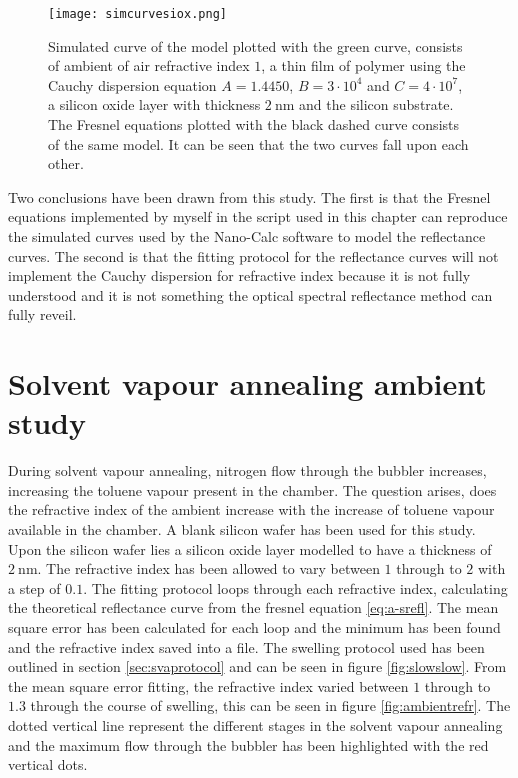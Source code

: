 \documentclass[MasterThesisMain.tex]{subfiles}
\begin{document}
\begin{figure}[H]
\centering
\texttt{[image: simcurvesiox.png]}
\caption{Simulated curve of the model plotted with the green curve, consists of ambient of air refractive index $1$, a thin film of polymer using the Cauchy dispersion equation $A=1.4450$, $B=3 \cdot 10^4$ and $C=4 \cdot 10^7$, a silicon oxide layer with thickness $\SI{2}{\nano\meter}$ and the silicon substrate. The Fresnel equations plotted with the black dashed curve consists of the same model. It can be seen that the two curves fall upon each other.}
\label{fig:simmodel2}
\end{figure}

Two conclusions have been drawn from this study. The first is that the Fresnel equations implemented by myself in the script used in this chapter can reproduce the simulated curves used by the Nano-Calc software to model the reflectance curves. The second is that the fitting protocol for the reflectance curves will not implement the Cauchy dispersion for refractive index because it is not fully understood and it is not something the optical spectral reflectance method can fully reveil.    
	
\section{Solvent vapour annealing ambient study}
During solvent vapour annealing, nitrogen flow through the bubbler increases, increasing the toluene vapour present in the chamber. The question arises, does the refractive index of the ambient increase with the increase of toluene vapour available in the chamber. A blank silicon wafer has been used for this study. Upon the silicon wafer lies a silicon oxide layer modelled to have a thickness of $\SI{2}{\nano\meter}$. The refractive index has been allowed to vary between $1$ through to $2$ with a step of $0.1$. The fitting protocol loops through each refractive index, calculating the theoretical reflectance curve from the fresnel equation \ref{eq:a-srefl}. The mean square error has been calculated for each loop and the minimum has been found and the refractive index saved into a file. The swelling protocol used has been outlined in section \ref{sec:svaprotocol} and can be seen in figure \ref{fig:slowslow}. From the mean square error fitting, the refractive index varied between $1$ through to $1.3$ through the course of swelling, this can be seen in figure \ref{fig:ambientrefr}. The dotted vertical line represent the different stages in the solvent vapour annealing and the maximum flow through the bubbler has been highlighted with the red vertical dots.
\end{document}
